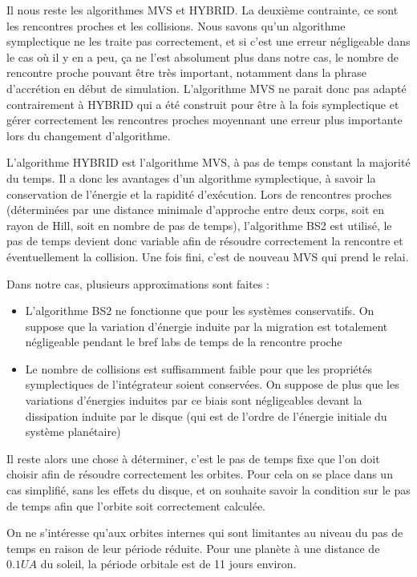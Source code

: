 Il nous reste les algorithmes MVS et HYBRID. La deuxième contrainte, ce sont les rencontres proches et les collisions. Nous savons qu'un algorithme symplectique ne les traite pas correctement, et si c'est une erreur négligeable dans le cas où il y en a peu, ça ne l'est absolument plus dans notre cas, le nombre de rencontre proche pouvant être très important, notamment dans la phrase d'accrétion en début de simulation. L'algorithme MVS ne parait donc pas adapté contrairement à HYBRID qui a été construit pour être à la fois symplectique et gérer correctement les rencontres proches moyennant une erreur plus importante lors du changement d'algorithme. 

L'algorithme HYBRID est l'algorithme MVS, à pas de temps constant la majorité du temps. Il a donc les avantages d'un algorithme symplectique, à savoir la conservation de l'énergie et la rapidité d'exécution. Lors de rencontres proches (déterminées par une distance minimale d'approche entre deux corps, soit en rayon de Hill, soit en nombre de pas de temps), l'algorithme BS2 est utilisé, le pas de temps devient donc variable afin de résoudre correctement la rencontre et éventuellement la collision. Une fois fini, c'est de nouveau MVS qui prend le relai. 

Dans notre cas, plusieurs approximations sont faites : 
\begin{itemize}
\item L'algorithme BS2 ne fonctionne que pour les systèmes conservatifs. On suppose que la variation d'énergie induite par la migration est totalement négligeable pendant le bref labs de temps de la rencontre proche
\item Le nombre de collisions est suffisamment faible pour que les propriétés symplectiques de l'intégrateur soient conservées. On suppose de plus que les variations d'énergies induites par ce biais sont négligeables devant la dissipation induite par le disque (qui est de l'ordre de l'énergie initiale du système planétaire)
\end{itemize}

Il reste alors une chose à déterminer, c'est le pas de temps fixe que l'on doit choisir afin de résoudre correctement les orbites. Pour cela on se place dans un cas simplifié, sans les effets du disque, et on souhaite savoir la condition sur le pas de temps afin que l'orbite soit correctement calculée. 

On ne s'intéresse qu'aux orbites internes qui sont limitantes au niveau du pas de temps en raison de leur période réduite. Pour une planète à une distance de $0.1\unit{UA}$ du soleil, la période orbitale est de 11 jours environ.


